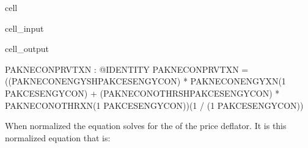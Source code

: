 \documentclass[letterpaper,10pt,english]{jupyterBook}
\begin{document}
\begin{sphinxuseclass}{cell}\begin{sphinxVerbatimInput}

\begin{sphinxuseclass}{cell_input}
\begin{sphinxVerbatim}[commandchars=\\\{\}]
\PYG{p}{[}\PYG{p}{]}
\end{sphinxVerbatim}

\end{sphinxuseclass}\end{sphinxVerbatimInput}
\begin{sphinxVerbatimOutput}

\begin{sphinxuseclass}{cell_output}
\begin{sphinxVerbatim}[commandchars=\\\{\}]
PAKNECONPRVTXN : @IDENTITY PAKNECONPRVTXN  = ((PAKNECONENGYSH\PYGZca{}PAKCESENGYCON)  * PAKNECONENGYXN\PYGZca{}(1  \PYGZhy{} PAKCESENGYCON)  + (PAKNECONOTHRSH\PYGZca{}PAKCESENGYCON)  * PAKNECONOTHRXN\PYGZca{}(1  \PYGZhy{} PAKCESENGYCON))\PYGZca{}(1  / (1  \PYGZhy{} PAKCESENGYCON))
\end{sphinxVerbatim}

\end{sphinxuseclass}\end{sphinxVerbatimOutput}

\end{sphinxuseclass}
\sphinxAtStartPar
When normalized the equation solves for the  of the price deflator.  It is this normalized equation that is:
\end{document}
